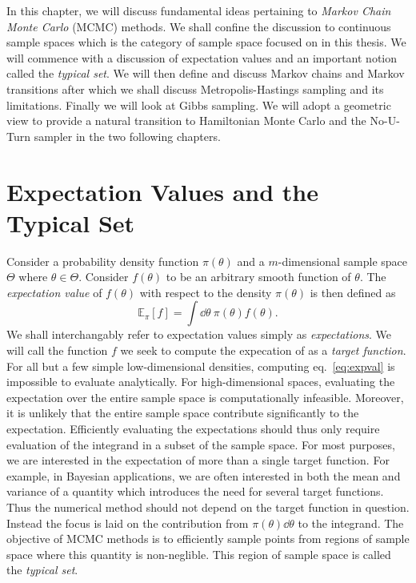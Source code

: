 In this chapter, we will discuss fundamental ideas pertaining to \textit{Markov Chain Monte Carlo} (MCMC) methods.
We shall confine the discussion to continuous sample spaces which is the category of sample space focused on in this thesis.
We will commence with a discussion of expectation values and an important notion called the \textit{typical set}. 
We will then define and discuss Markov chains and Markov transitions after which we shall
discuss Metropolis-Hastings sampling and its limitations. Finally we will
look at Gibbs sampling.
We will adopt a geometric view to provide a natural transition to Hamiltonian Monte Carlo and the No-U-Turn sampler
in the two following chapters. 

\section{Expectation Values and the Typical Set}
Consider a probability density function $\pi(\theta)$ and a $m$-dimensional sample space $\Theta$ where $\theta \in \Theta$. 
Consider $f(\theta)$ to be an arbitrary smooth
function of $\theta$. The \textit{expectation value} of $f(\theta)$ with respect to the density $\pi(\theta)$ is then defined as
\begin{equation}\label{eq:expval}
    \mathbb{E}_\pi[f] = \int \dd \theta \ \pi(\theta)f(\theta).
\end{equation}
We shall interchangably refer to expectation values simply as \textit{expectations}.
We will call the function $f$ we seek to compute the expecation of as a \textit{target function}.
For all but a few simple low-dimensional densities, computing eq.~\eqref{eq:expval} is impossible to evaluate analytically. 
For high-dimensional spaces, evaluating the expectation over the entire sample space is computationally infeasible.
Moreover, it is unlikely that the entire sample space contribute significantly to the expectation. Efficiently
evaluating the expectations should thus only require evaluation of the integrand in a subset of the sample space.
For most purposes, we are interested in the expectation of more than a single target function. For example, in Bayesian applications,
we are often interested in both the mean and variance of a quantity which introduces the need for several target functions. 
Thus the numerical method should not depend on the target function in question. 
Instead the focus is laid on the contribution from $\pi(\theta)\dd \theta$ to
the integrand. The objective of MCMC methods is to efficiently 
sample points from regions of sample space where this quantity is non-neglible. This region of sample space
is called the \textit{typical set}. 

